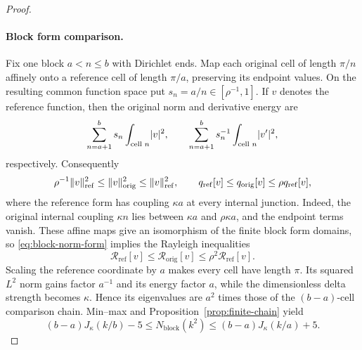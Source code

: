 \begin{proof}
\paragraph{Block form comparison.}
Fix one block $a<n\le b$ with Dirichlet ends.
Map each original cell of length $\pi/n$ affinely onto a
reference cell of length $\pi/a$, preserving its endpoint
values. On the resulting common function space put
$s_n=a/n\in[\rho^{-1},1]$. If $v$ denotes the reference
function, then the original norm and derivative energy are
\[
 \sum_{n=a+1}^b s_n\int_{\text{cell }n}\lvert v\rvert^2,
 \qquad
 \sum_{n=a+1}^b s_n^{-1}\int_{\text{cell }n}\lvert v'\rvert^2,
\]
respectively. Consequently
\begin{equation}
 \rho^{-1}\lVert v\rVert_{\mathrm{ref}}^2
    \le\lVert v\rVert_{\mathrm{orig}}^2
    \le\lVert v\rVert_{\mathrm{ref}}^2,
 \qquad
 q_{\mathrm{ref}}[v]\le q_{\mathrm{orig}}[v]
                         \le\rho q_{\mathrm{ref}}[v],
 \label{eq:block-norm-form}
\end{equation}
where the reference form has coupling $\kappa a$ at every
internal junction. Indeed, the original internal coupling
$\kappa n$ lies between $\kappa a$ and $\rho\kappa a$,
and the endpoint terms vanish. These affine maps give an
isomorphism of the finite block form domains, so
\eqref{eq:block-norm-form} implies the Rayleigh inequalities
\begin{equation}
 \mathcal R_{\mathrm{ref}}[v]
     \le\mathcal R_{\mathrm{orig}}[v]
     \le\rho^2\mathcal R_{\mathrm{ref}}[v].
 \label{eq:block-rayleigh}
\end{equation}
Scaling the reference coordinate by $a$ makes every cell have
length $\pi$. Its squared $L^2$ norm gains factor $a^{-1}$ and its energy
factor $a$, while the dimensionless delta strength becomes
$\kappa$. Hence its eigenvalues are $a^2$ times those of
the $(b-a)$-cell comparison chain. Min--max and
Proposition~\ref{prop:finite-chain} yield
\begin{equation}
 (b-a)J_\kappa(k/b)-5
       \le N_{\mathrm{block}}(k^2)
       \le(b-a)J_\kappa(k/a)+5.
 \label{eq:block-count}
\end{equation}


\end{proof}
